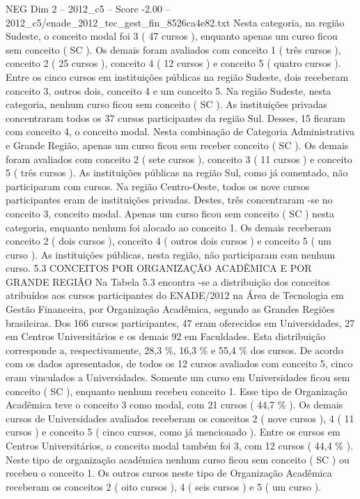 \begin{textsample}{NEG Dim 2 – 2012\_c5 – Score -2.00 – 2012\_c5/enade\_2012\_tec\_gest\_fin\_8526ca4e82.txt}
Nesta categoria, na região Sudeste, o conceito modal foi 3 ( 47 cursos ), enquanto apenas um curso ficou sem conceito ( SC ).
Os demais foram avaliados com conceito 1 ( três cursos ), conceito 2 ( 25 cursos ), conceito 4 ( 12 cursos ) e conceito 5 ( quatro cursos ).
Entre os cinco cursos em instituições públicas na região Sudeste, dois receberam conceito 3, outros dois, conceito 4 e um conceito 5.
Na região Sudeste, nesta categoria, nenhum curso ficou sem conceito ( SC ).
As instituições privadas concentraram todos os 37 cursos participantes da região Sul.
Desses, 15 ficaram com conceito 4, o conceito modal.
Nesta combinação de Categoria Administrativa e Grande Região, apenas um curso ficou sem receber conceito ( SC ).
Os demais foram avaliados com conceito 2 ( sete cursos ), conceito 3 ( 11 cursos ) e conceito 5 ( três cursos ).
As instituições públicas na região Sul, como já comentado, não participaram com cursos.
Na região Centro-Oeste, todos os nove cursos participantes eram de instituições privadas.
Destes, três concentraram -se no conceito 3, conceito modal.
Apenas um curso ficou sem conceito ( SC ) nesta categoria, enquanto nenhum foi alocado ao conceito 1.
Os demais receberam conceito 2 ( dois cursos ), conceito 4 ( outros dois cursos ) e conceito 5 ( um curso ).
As instituições públicas, nesta região, não participaram com nenhum curso. 5.3 CONCEITOS POR ORGANIZAÇÃO ACADÊMICA E POR GRANDE REGIÃO Na Tabela 5.3 encontra -se a distribuição dos conceitos atribuídos aos cursos participantes do ENADE/2012 na Área de Tecnologia em Gestão Financeira, por Organização Acadêmica, segundo as Grandes Regiões brasileiras.
Dos 166 cursos participantes, 47 eram oferecidos em Universidades, 27 em Centros Universitários e os demais 92 em Faculdades.
Esta distribuição corresponde a, respectivamente, 28,3 \%, 16,3 \% e 55,4 \% dos cursos.
De acordo com os dados apresentados, de todos os 12 cursos avaliados com conceito 5, cinco eram vinculados a Universidades.
Somente um curso em Universidades ficou sem conceito ( SC ), enquanto nenhum recebeu conceito 1.
Esse tipo de Organização Acadêmica teve o conceito 3 como modal, com 21 cursos ( 44,7 \% ).
Os demais cursos de Universidades avaliados receberam os conceitos 2 ( nove cursos ), 4 ( 11 cursos ) e conceito 5 ( cinco cursos, como já mencionado ).
Entre os cursos em Centros Universitários, o conceito modal também foi 3, com 12 cursos ( 44,4 \% ).
Neste tipo de organização acadêmica nenhum curso ficou sem conceito ( SC ) ou recebeu o conceito 1.
Os outros cursos neste tipo de Organização Acadêmica receberam os conceitos 2 ( oito cursos ), 4 ( seis cursos ) e 5 ( um curso ).

\end{textsample}
